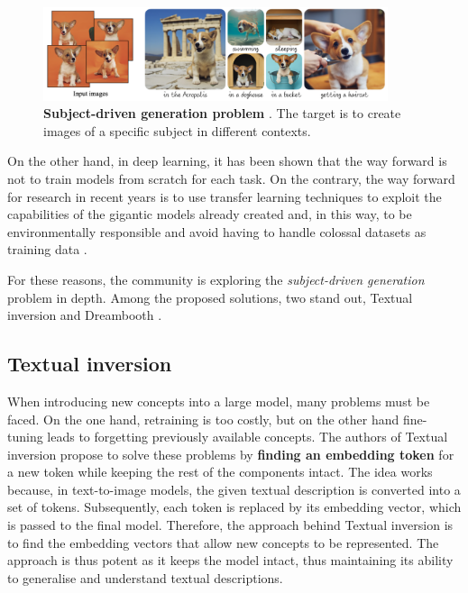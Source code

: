 \begin{figure}
    \centering
    \includegraphics[width=0.9\textwidth]{Pictures/subjectD.png} 
    \caption{\textbf{Subject-driven generation problem} \cite{ruiz2023dreambooth}. The target is to create images of a specific subject in different contexts.}
    \label{fig:subjectD}
\end{figure}

On the other hand, in deep learning, it has been shown that the way forward is not to train models from scratch for each task. On the contrary, the way forward for research in recent years is to use transfer learning techniques to exploit the capabilities of the gigantic models already created and, in this way, to be environmentally responsible and avoid having to handle colossal datasets as training data \cite{zhuang2020comprehensive}.

For these reasons, the community is exploring the \textit{subject-driven generation} problem in depth. Among the proposed solutions, two stand out, Textual inversion \cite{gal2022image} and Dreambooth \cite{ruiz2023dreambooth}.

\subsection{Textual inversion}

When introducing new concepts into a large model, many problems must be faced. On the one hand, retraining is too costly, but on the other hand fine-tuning leads to forgetting previously available concepts. The authors of Textual inversion propose to solve these problems by \textbf{finding an embedding token} for a new token while keeping the rest of the components intact. The idea works because, in text-to-image models, the given textual description is converted into a set of tokens. Subsequently, each token is replaced by its embedding vector, which is passed to the final model. Therefore, the approach behind Textual inversion is to find the embedding vectors that allow new concepts to be represented. The approach is thus potent as it keeps the model intact, thus maintaining its ability to generalise and understand textual descriptions. 

